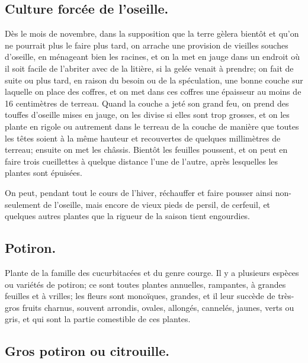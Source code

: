 \documentclass[10pt,a4paper]{book}
\begin{document}
\subsection{Culture forcée de l'oseille.}

Dès le mois de novembre, dans la supposition que la terre gèlera bientôt et qu'on ne pourrait plus le faire plus tard, on arrache une provision de vieilles souches d'oseille, en ménageant bien les racines, et on la met en jauge dans un endroit où il soit facile de l'abriter avec de la litière, si la gelée venait à prendre; on fait de suite ou plus tard, en raison du besoin ou de la spéculation, une bonne couche sur laquelle on place des coffres, et on met dans ces coffres une épaisseur au moins de 16 centimètres de terreau. Quand la couche a jeté son grand feu, on prend des touffes d'oseille mises en jauge, on les divise si elles sont trop grosses, et on les plante en rigole ou autrement dans le terreau de la couche de manière que toutes les têtes soient à la même hauteur et recouvertes de quelques millimètres de terreau; ensuite on met les châssis. Bientôt les feuilles poussent, et on peut en faire trois cueillettes à quelque distance l'une de l'autre, après lesquelles les plantes sont épuisées.

On peut, pendant tout le cours de l'hiver, réchauffer et faire pousser ainsi non-seulement de l'oseille, mais encore de vieux pieds de persil, de cerfeuil, et quelques autres plantes que la rigueur de la saison tient engourdies.

\subsection{Potiron.}

Plante de la famille des cucurbitacées et du genre courge. Il y a plusieurs espèces ou variétés de potiron; ce sont toutes plantes annuelles, rampantes, à grandes feuilles et à vrilles; les fleurs sont monoïques, grandes, et il leur succède de très-gros fruits charnus, souvent arrondis, ovales, allongés, cannelés, jaunes, verts ou gris, et qui sont la partie comestible de ces plantes.

\subsection{Gros potiron ou citrouille.}
\end{document}
